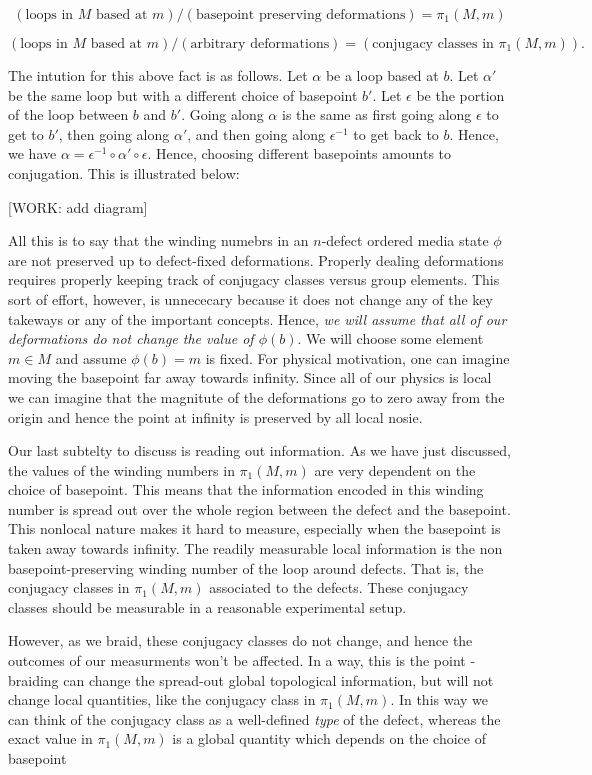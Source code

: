 $$\left(\text{loops in $M$ based at $m$}\right)/\left(\text{basepoint preserving deformations}\right)= \pi_1(M,m)$$

$$\left(\text{loops in $M$ based at $m$}\right)/\left(\text{arbitrary deformations}\right)= \left(\text{conjugacy classes in }\pi_1(M,m)\right).$$

The intution for this above fact is as follows. Let $\alpha$ be a loop based at $b$. Let $\alpha'$ be the same loop but with a different choice of basepoint $b'$. Let $\epsilon$ be the portion of the loop between $b$ and $b'$. Going along $\alpha$ is the same as first going along $\epsilon$ to get to $b'$, then going along $\alpha'$, and then going along $\epsilon^{-1}$ to get back to $b$. Hence, we have $\alpha = \epsilon^{-1}\circ \alpha' \circ \epsilon$. Hence, choosing different basepoints amounts to conjugation. This is illustrated below:

[WORK: add diagram]

All this is to say that the winding numebrs in an $n$-defect ordered media state $\phi$ are not preserved up to defect-fixed deformations. Properly dealing deformations requires properly keeping track of conjugacy classes versus group elements. This sort of effort, however, is unnececary because it does not change any of the key takeways or any of the important concepts. Hence, \textit{we will assume that all of our deformations do not change the value of $\phi(b)$}. We will choose some element $m\in M$ and assume $\phi(b)=m$ is fixed. For physical motivation, one can imagine moving the basepoint far away towards infinity. Since all of our physics is local we can imagine that the magnitute of the deformations go to zero away from the origin and hence the point at infinity is preserved by all local nosie.

Our last subtelty to discuss is reading out information. As we have just discussed, the values of the winding numbers in $\pi_1(M,m)$ are very dependent on the choice of basepoint. This means that the information encoded in this winding number is spread out over the whole region between the defect and the basepoint. This nonlocal nature makes it hard to measure, especially when the basepoint is taken away towards infinity. The readily measurable local information is the non basepoint-preserving winding number of the loop around defects. That is, the conjugacy classes in $\pi_1(M,m)$ associated to the defects. These conjugacy classes should be measurable in a reasonable experimental setup.

However, as we braid, these conjugacy classes do not change, and hence the outcomes of our measurments won't be affected. In a way, this is the point - braiding can change the spread-out global topological information, but will not change local quantities, like the conjugacy class in $\pi_1(M,m)$. In this way we can think of the conjugacy class as a well-defined \textit{type} of the defect, whereas the exact value in $\pi_1(M,m)$ is a global quantity which depends on the choice of basepoint


